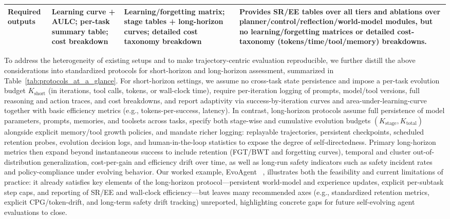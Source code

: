 \begin{table}[t!]
{\begin{tabular}{m{3.4cm}m{6.0cm}m{6.0cm}m{7.8cm}}
\cellcolor[rgb]{0.96,0.96,0.96}\textbf{Required outputs} 
& \cellcolor[rgb]{0.96,0.96,0.96}Learning curve + AULC; per-task summary table; cost breakdown 
& \cellcolor[rgb]{0.96,0.96,0.96}Learning/forgetting matrix; stage tables + long-horizon curves; detailed cost taxonomy breakdown 
& \cellcolor[rgb]{0.96,0.96,0.96}Provides SR/EE tables over all tiers and ablations over planner/control/reflection/world-model modules, but no learning/forgetting matrices or detailed cost-taxonomy (tokens/time/tool/memory) breakdowns. \\
\bottomrule
\end{tabular}}
\end{table}

To address the heterogeneity of existing setups and to make trajectory-centric evaluation reproducible, we further distill the above considerations into standardized protocols for short-horizon and long-horizon assessment, summarized in Table~\ref{tab:protocols_at_a_glance}. For short-horizon settings, we assume no cross-task state persistence and impose a per-task evolution budget $K_{\text{short}}$ (in iterations, tool calls, tokens, or wall-clock time), require per-iteration logging of prompts, model/tool versions, full reasoning and action traces, and cost breakdowns, and report adaptivity via success-by-iteration curves and area-under-learning-curve together with basic efficiency metrics (e.g., tokens-per-success, latency). In contrast, long-horizon protocols assume full persistence of model parameters, prompts, memories, and toolsets across tasks, specify both stage-wise and cumulative evolution budgets $(K_{\text{stage}}, K_{\text{total}})$ alongside explicit memory/tool growth policies, and mandate richer logging: replayable trajectories, persistent checkpoints, scheduled retention probes, evolution decision logs, and human-in-the-loop statistics to expose the degree of self-directedness. Primary long-horizon metrics then expand beyond instantaneous success to include retention (FGT/BWT and forgetting curves), temporal and cluster out-of-distribution generalization, cost-per-gain and efficiency drift over time, as well as long-run safety indicators such as safety incident rates and policy-compliance under evolving behavior. Our worked example, EvoAgent ~\citep{yuan2025evoagentautomaticmultiagentgeneration}, illustrates both the feasibility and current limitations of practice: it already satisfies key elements of the long-horizon protocol—persistent world-model and experience updates, explicit per-subtask step caps, and reporting of SR/EE and wall-clock efficiency—but leaves many recommended axes (e.g., standardized retention metrics, explicit CPG/token-drift, and long-term safety drift tracking) unreported, highlighting concrete gaps for future self-evolving agent evaluations to close.




